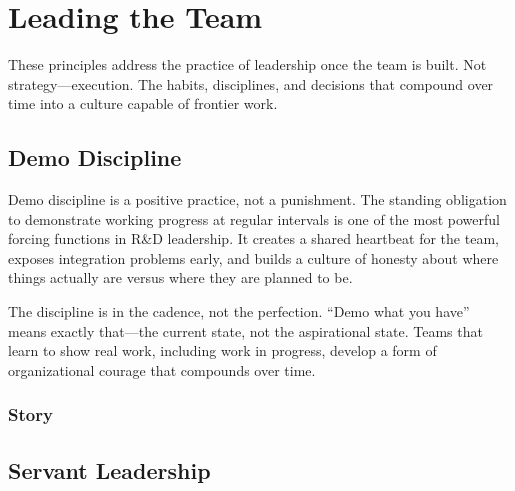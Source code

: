 
\chapter{Leading the Team}


These principles address the practice of leadership once the team is built.
Not strategy---execution. The habits, disciplines, and decisions that compound
over time into a culture capable of frontier work.

\section{Demo Discipline}


Demo discipline is a positive practice, not a punishment. The standing obligation
to demonstrate working progress at regular intervals is one of the most powerful
forcing functions in R\&D leadership. It creates a shared heartbeat for the team,
exposes integration problems early, and builds a culture of honesty about where
things actually are versus where they are planned to be.

The discipline is in the cadence, not the perfection. ``Demo what you have'' means
exactly that---the current state, not the aspirational state. Teams that learn to
show real work, including work in progress, develop a form of organizational
courage that compounds over time.

\subsection{Story}

\section{Servant Leadership}

